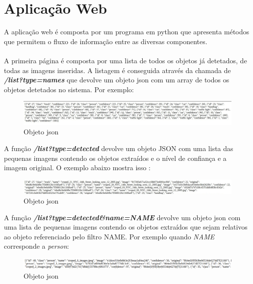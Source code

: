 \documentclass{report}
\begin{document}
\chapter{Aplicação Web}
\label{chap.aplicacaoweb}
A aplicação web é composta por um programa em python que apresenta métodos que permitem o fluxo de informação entre as diversas componentes.\\
\\
A primeira página é composta por uma lista de todos os objetos já detetados, de todas as imagens inseridas. A listagem é conseguida através da chamada de \textbf{\textit{/list?type=names }} que devolve um objeto \ac{json} com um array de todos os objetos detetados no sistema. Por exemplo: 
\vspace{5 mm}
\begin{figure}[!ht]
    \centering
    \includegraphics[scale = 0.3]{foto.jpg}
    \caption{Objeto \ac{json}}
    \label{fig:object1}
\end{figure}

A função \textbf{\textit{/list?type=detected}} devolve um objeto JSON com uma lista das pequenas imagens contendo os objetos extraídos e o nível de confiança e a imagem original. O exemplo abaixo mostra isso :

\vspace{5 mm}
\begin{figure}[!ht]
    \centering
    \includegraphics[scale = 0.3]{detect.jpg}
    \caption{Objeto \ac{json}}
    \label{fig:object2}
\end{figure}

A função  \textbf{\textit{/list?type=detected\&name=NAME}} devolve um objeto \ac{json} com uma lista de pequenas imagens contendo os objetos extraídos que sejam relativos ao objeto referenciado pelo filtro NAME.
Por exemplo quando \textit{NAME} corresponde a \textit{person}:
\vspace{5 mm}
\begin{figure}[!ht]
    \centering
    \includegraphics[scale = 0.3]{person.png}
    \caption{Objeto \ac{json}}
    \label{fig:object3}
\end{figure}
\end{document}
